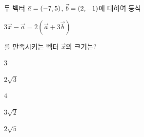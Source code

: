 두 벡터 $\vec{a}=(-7{,}\mkern3mu\mathopen{}5)$, $\vec{b}=(2{,}\mkern3mu\mathopen{}-1)$에 대하여 등식 \par\smallskip\noindent\hspace*{1.5em}$3\vec{x}-\vec{a}=2(\vec{a}+3\vec{b})$\par\smallskip\noindent 를 만족시키는 벡터 $\vec{x}$의 크기는?
\begin{choices32}{\rule[-3ex]{0pt}{8ex}$3$}{\rule[-3ex]{0pt}{8ex}$2\sqrt{3}$}{\rule[-3ex]{0pt}{8ex}$4$}{\rule[-3ex]{0pt}{8ex}$3\sqrt{2}$}{\rule[-3ex]{0pt}{8ex}$2\sqrt{5}$}\end{choices32}
